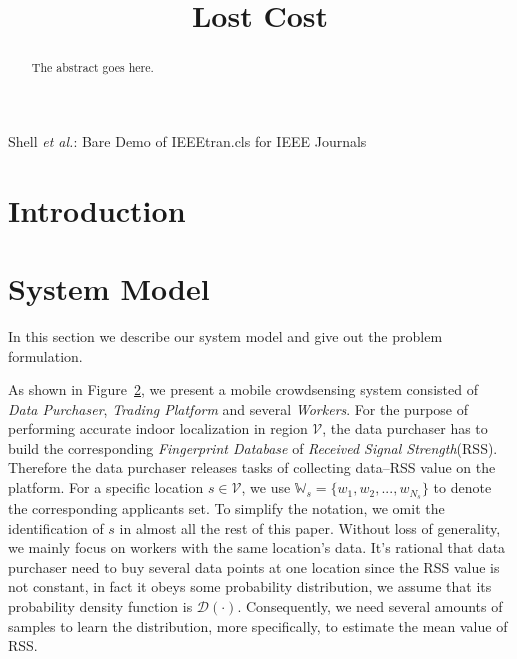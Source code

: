 \documentclass[journal]{IEEEtran}
\begin{document}
\title{Lost Cost}






%
{Shell \MakeLowercase{\textit{et al.}}: Bare Demo of IEEEtran.cls for IEEE Journals}

\maketitle

\begin{abstract}
The abstract goes here.
\end{abstract}


\section{Introduction}

\section{System Model}

In this section we describe our system model and give out the problem formulation.

As shown in Figure~\ref{}, we present a mobile crowdsensing system consisted of \emph{Data Purchaser}, \emph{Trading Platform} and several \emph{Workers}. For the purpose of performing accurate indoor localization in region $\mathcal{V}$, the data purchaser has to build the corresponding \emph{Fingerprint Database} of \emph{Received Signal Strength}(RSS). Therefore the data purchaser releases tasks of collecting data--RSS value on the platform. For a specific location $s\in \mathcal{V}$, we use $\mathds{W}_s=\{w_1,w_2,...,w_{N_s}\}$ to denote the corresponding applicants set. To simplify the notation, we omit the identification of $s$ in almost all the rest of this paper. Without loss of generality, we mainly focus on workers with the same location's data. It's rational that data purchaser need to buy several data points at one location since the RSS value is not constant, in fact it obeys some probability distribution, we assume that its probability density function is $\mathcal{D}(\cdot)$. Consequently, we need several amounts of samples to learn the distribution, more specifically, to estimate the mean value of RSS.
\end{document}
